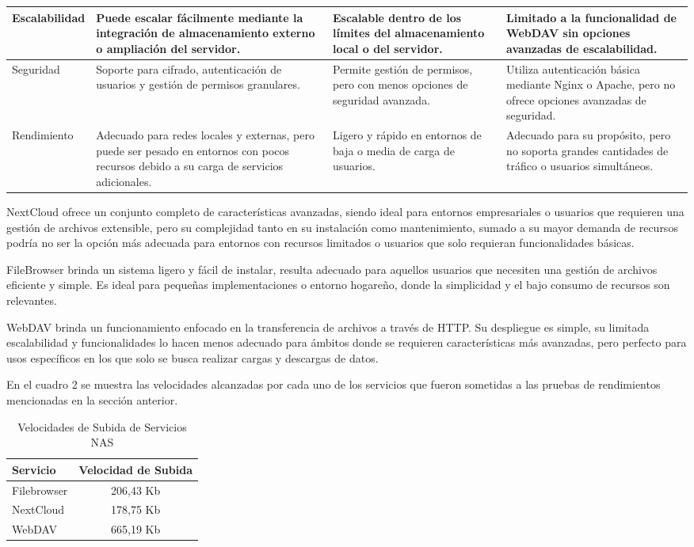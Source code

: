 \documentclass[a4paper,10pt]{article}
\begin{document}
\begin{table}[htbp]
\begin{tabularx}{\textwidth}{|X|X|X|X|}
			\hline
			Escalabilidad & Puede escalar fácilmente mediante la integración de almacenamiento externo o ampliación del servidor. & Escalable dentro de los límites del almacenamiento local o del servidor. & Limitado a la funcionalidad de WebDAV sin opciones avanzadas de escalabilidad. \\
			\hline
			Seguridad & Soporte para cifrado, autenticación de usuarios y gestión de permisos granulares. & Permite gestión de permisos, pero con menos opciones de seguridad avanzada. & Utiliza autenticación básica mediante Nginx o Apache, pero no ofrece opciones avanzadas de seguridad. \\
			\hline
			Rendimiento & Adecuado para redes locales y externas, pero puede ser pesado en entornos con pocos recursos debido a su carga de servicios adicionales. & Ligero y rápido en entornos de baja o media de carga de usuarios. & Adecuado para su propósito, pero no soporta grandes cantidades de tráfico o usuarios simultáneos. \\
			\hline
		\end{tabularx}
	\end{table}
	
	NextCloud ofrece un conjunto completo de características avanzadas, siendo ideal para entornos empresariales o usuarios que requieren una gestión de archivos extensible, pero su complejidad tanto en su instalación como mantenimiento, sumado a su mayor demanda de recursos podría no ser la opción más adecuada para entornos con recursos limitados o usuarios que solo requieran funcionalidades básicas.
	
	FileBrowser brinda un sistema ligero y fácil de instalar, resulta adecuado para aquellos usuarios que necesiten una gestión de archivos eficiente y simple. Es ideal para pequeñas implementaciones o entorno hogareño, donde la simplicidad y el bajo consumo de recursos son relevantes.
	
	WebDAV brinda un funcionamiento enfocado en la transferencia de archivos a través de HTTP. Su despliegue es simple, su limitada escalabilidad y funcionalidades lo hacen menos adecuado para ámbitos donde se requieren características más avanzadas, pero perfecto para usos específicos en los que solo se busca realizar cargas y descargas de datos.
	
	En el cuadro 2 se muestra las velocidades alcanzadas por cada uno de los servicios que fueron sometidas a las pruebas de rendimientos mencionadas en la sección anterior.
	
	\begin{table}[H]
		\centering
		\caption{Velocidades de Subida de Servicios NAS}
		\begin{tabular}{|l|c|}
			\hline
			\textbf{Servicio} & \textbf{Velocidad de Subida} \\
			\hline
			Filebrowser & 206,43 Kb \\
			\hline
			NextCloud & 178,75 Kb \\
			\hline
			WebDAV & 665,19 Kb \\
			\hline
		\end{tabular}
	\end{table}
	
\end{document}
